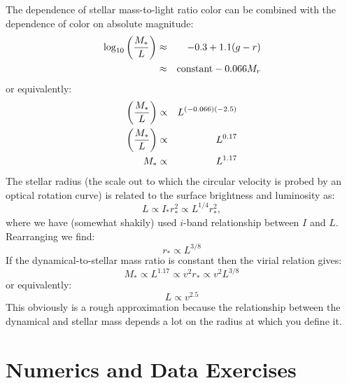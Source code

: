 \begin{enumerate}
\begin{answer}
The \citet{bell00a} dependence of stellar mass-to-light ratio color
can be combined with the dependence of color on absolute magnitude:
\begin{eqnarray}
\log_{10} \left(\frac{M_\ast}{L}\right) &\approx& -0.3 + 1.1 (g-r) \cr
&\approx& \mathrm{constant} - 0.066 M_r  \cr
\end{eqnarray}
or equivalently:
\begin{eqnarray}
\left(\frac{M_\ast}{L}\right) &\propto& L^{(-0.066)(-2.5)} \cr
\left(\frac{M_\ast}{L}\right) &\propto& L^{0.17} \cr
M_\ast &\propto& L^{1.17}
\end{eqnarray}
The stellar radius (the scale out to which the circular velocity is
probed by an optical rotation curve) is related to the surface
brightness and luminosity as:
\begin{equation}
L \propto I_\ast r_\ast^2 \propto L^{1/4} r_\ast^2,
\end{equation}
where we have (somewhat shakily) used $i$-band relationship between
$I$ and $L$.  Rearranging we find:
\begin{equation}
r_\ast \propto L^{3/8}
\end{equation}
If the dynamical-to-stellar mass ratio is constant then the virial
relation gives:
\begin{equation}
M_\ast \propto L^{1.17} \propto v^2 r_\ast \propto v^2 L^{3/8}
\end{equation}
or equivalently:
\begin{equation}
L \propto v^{2.5}
\end{equation}
This obviously is a rough approximation because the relationship
between the dynamical and stellar mass depends a lot on the radius at
which you define it.
\end{answer}
\end{enumerate}

\section{Numerics and Data Exercises}

